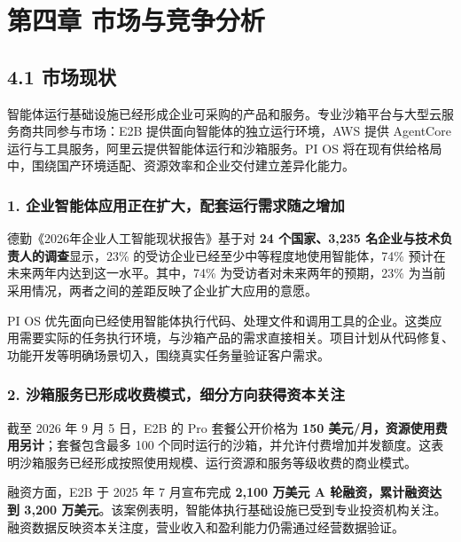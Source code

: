 \section{第四章 市场与竞争分析}\label{ux7b2cux56dbux7ae0-ux5e02ux573aux4e0eux7adeux4e89ux5206ux6790}

\subsection{4.1 市场现状}\label{ux5e02ux573aux73b0ux72b6}

智能体运行基础设施已经形成企业可采购的产品和服务。专业沙箱平台与大型云服务商共同参与市场：E2B 提供面向智能体的独立运行环境，AWS 提供 AgentCore 运行与工具服务，阿里云提供智能体运行和沙箱服务。PI OS 将在现有供给格局中，围绕国产环境适配、资源效率和企业交付建立差异化能力。

\subsubsection{1. 企业智能体应用正在扩大，配套运行需求随之增加}\label{ux4f01ux4e1aux667aux80fdux4f53ux5e94ux7528ux6b63ux5728ux6269ux5927ux914dux5957ux8fd0ux884cux9700ux6c42ux968fux4e4bux589eux52a0}

德勤《2026年企业人工智能现状报告》基于对 \textbf{24 个国家、3,235 名企业与技术负责人的调查}显示，23\% 的受访企业已经至少中等程度地使用智能体，74\% 预计在未来两年内达到这一水平。其中，74\% 为受访者对未来两年的预期，23\% 为当前采用情况，两者之间的差距反映了企业扩大应用的意愿。

PI OS 优先面向已经使用智能体执行代码、处理文件和调用工具的企业。这类应用需要实际的任务执行环境，与沙箱产品的需求直接相关。项目计划从代码修复、功能开发等明确场景切入，围绕真实任务量验证客户需求。

\subsubsection{2. 沙箱服务已形成收费模式，细分方向获得资本关注}\label{ux6c99ux7bb1ux670dux52a1ux5df2ux5f62ux6210ux6536ux8d39ux6a21ux5f0fux7ec6ux5206ux65b9ux5411ux83b7ux5f97ux8d44ux672cux5173ux6ce8}

截至 2026 年 9 月 5 日，E2B 的 Pro 套餐公开价格为 \textbf{150 美元/月，资源使用费用另计}；套餐包含最多 100 个同时运行的沙箱，并允许付费增加并发额度。这表明沙箱服务已经形成按照使用规模、运行资源和服务等级收费的商业模式。

融资方面，E2B 于 2025 年 7 月宣布完成 \textbf{2,100 万美元 A 轮融资，累计融资达到 3,200 万美元}。该案例表明，智能体执行基础设施已受到专业投资机构关注。融资数据反映资本关注度，营业收入和盈利能力仍需通过经营数据验证。

